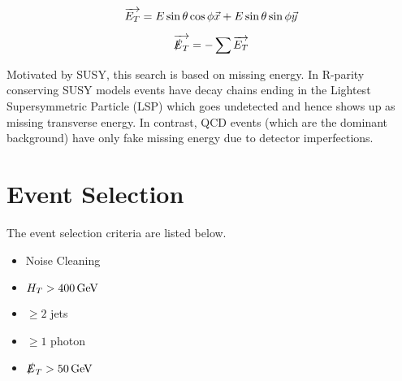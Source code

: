 \begin{equation}
\overrightarrow{E_{T}} = E\sin{\theta}\cos{\phi}\vec{x} + E\sin{\theta}\sin{\phi}\vec{y}
\label{eq:et}
\end{equation}

\begin{equation}
\overrightarrow{\slashed{E}_{T}} = - \sum \overrightarrow{E_{T}}
\label{eq:met}
\end{equation}

Motivated by SUSY, this search is based on missing energy. In R-parity
conserving SUSY models events have decay chains ending in the Lightest 
Supersymmetric Particle (LSP) which goes undetected and hence shows up as 
missing transverse energy. In contrast, QCD events (which are the dominant 
background) have only fake missing energy due to detector imperfections. \\

\section{Event Selection}
\label{sec:Event_Selection}

The event selection criteria are listed below. 

\begin{itemize}
\item Noise Cleaning
\item $H_{T} > 400 \, \mathrm{GeV}$
\item $\geq 2$ jets
\item $\geq 1$ photon
\item $\slashed{E}_{T} > 50 \, \mathrm{GeV}$
\end{itemize}

